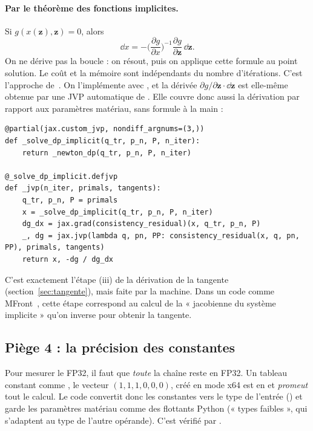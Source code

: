 \paragraph{Par le théorème des fonctions implicites.} Si $g(x(\mathbf{z}),\mathbf{z})=0$, alors
\begin{equation}
\dd x = -\Big(\frac{\partial g}{\partial x}\Big)^{-1}\frac{\partial g}{\partial\mathbf{z}}\,\dd\mathbf{z}.
\end{equation}
On ne dérive pas la boucle : on résout, puis on applique cette formule au point solution. Le coût et la mémoire sont indépendants du nombre d'itérations. C'est l'approche de~\cite{blondel2022}. On l'implémente avec , et la dérivée $\partial g/\partial\mathbf{z}\cdot\dd\mathbf{z}$ est elle-même obtenue par une JVP automatique de . Elle couvre donc aussi la dérivation par rapport aux paramètres matériau, sans formule à la main :
\begin{lstlisting}
@partial(jax.custom_jvp, nondiff_argnums=(3,))
def _solve_dp_implicit(q_tr, p_n, P, n_iter):
    return _newton_dp(q_tr, p_n, P, n_iter)

@_solve_dp_implicit.defjvp
def _jvp(n_iter, primals, tangents):
    q_tr, p_n, P = primals
    x = _solve_dp_implicit(q_tr, p_n, P, n_iter)
    dg_dx = jax.grad(consistency_residual)(x, q_tr, p_n, P)
    _, dg = jax.jvp(lambda q, pn, PP: consistency_residual(x, q, pn, PP), primals, tangents)
    return x, -dg / dg_dx
\end{lstlisting}
C'est exactement l'étape (iii) de la dérivation de la tangente (section~\ref{sec:tangente}), mais faite par la machine. Dans un code comme MFront~\cite{helfer2015}, cette étape correspond au calcul de la « jacobienne du système implicite » qu'on inverse pour obtenir la tangente.

\subsection{Piège 4 : la précision des constantes}

Pour mesurer le FP32, il faut que \emph{toute} la chaîne reste en FP32. Un tableau constant comme , le vecteur $(1,1,1,0,0,0)$, créé en mode x64 est en  et \emph{promeut} tout le calcul. Le code convertit donc les constantes vers le type de l'entrée () et garde les paramètres matériau comme des flottants Python (« types faibles », qui s'adaptent au type de l'autre opérande). C'est vérifié par .
